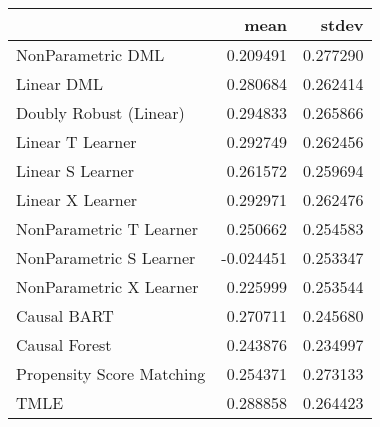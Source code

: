 \begin{tabular}{lrr}
\toprule
{} &      mean &     stdev \\
\midrule
NonParametric DML         &  0.209491 &  0.277290 \\
Linear DML                &  0.280684 &  0.262414 \\
Doubly Robust (Linear)    &  0.294833 &  0.265866 \\
Linear T Learner          &  0.292749 &  0.262456 \\
Linear S Learner          &  0.261572 &  0.259694 \\
Linear X Learner          &  0.292971 &  0.262476 \\
NonParametric T Learner   &  0.250662 &  0.254583 \\
NonParametric S Learner   & -0.024451 &  0.253347 \\
NonParametric X Learner   &  0.225999 &  0.253544 \\
Causal BART               &  0.270711 &  0.245680 \\
Causal Forest             &  0.243876 &  0.234997 \\
Propensity Score Matching &  0.254371 &  0.273133 \\
TMLE                      &  0.288858 &  0.264423 \\
\bottomrule
\end{tabular}
